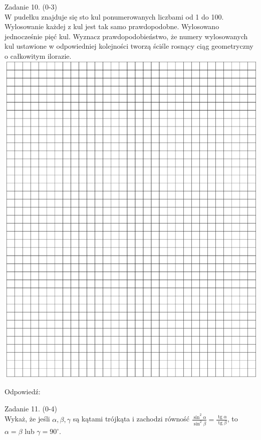 \documentclass[10pt]{article}
\begin{document}
Zadanie 10. (0-3)\\
W pudełku znajduje się sto kul ponumerowanych liczbami od 1 do 100. Wylosowanie każdej z kul jest tak samo prawdopodobne. Wylosowano jednocześnie pięć kul. Wyznacz prawdopodobieństwo, że numery wylosowanych kul ustawione w odpowiedniej kolejności tworzą ściśle rosnący ciąg geometryczny o całkowitym ilorazie.\\
\includegraphics[max width=\textwidth, center]{2024_11_21_5abc0108fbbc287103ecg-08}

Odpowiedź:

Zadanie 11. (0-4)\\
Wykaż, że jeśli \(\alpha, \beta, \gamma\) są kątami trójkąta i zachodzi równość \(\frac{\sin ^{2} \alpha}{\sin ^{2} \beta}=\frac{\operatorname{tg} \alpha}{\operatorname{tg} \beta}\), to \(\alpha=\beta\) lub \(\gamma=90^{\circ}\).
\end{document}
